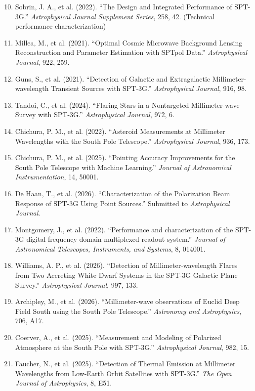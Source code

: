 \documentclass[11pt,a4paper]{article}
\begin{document}
\begin{enumerate}
\setcounter{enumi}{9}
\item Sobrin, J. A., et al. (2022). ``The Design and Integrated Performance of SPT-3G.'' \textit{Astrophysical Journal Supplement Series}, 258, 42. (Technical performance characterization)

\item Millea, M., et al. (2021). ``Optimal Cosmic Microwave Background Lensing Reconstruction and Parameter Estimation with SPTpol Data.'' \textit{Astrophysical Journal}, 922, 259.

\item Guns, S., et al. (2021). ``Detection of Galactic and Extragalactic Millimeter-wavelength Transient Sources with SPT-3G.'' \textit{Astrophysical Journal}, 916, 98.

\item Tandoi, C., et al. (2024). ``Flaring Stars in a Nontargeted Millimeter-wave Survey with SPT-3G.'' \textit{Astrophysical Journal}, 972, 6.

\item Chichura, P. M., et al. (2022). ``Asteroid Measurements at Millimeter Wavelengths with the South Pole Telescope.'' \textit{Astrophysical Journal}, 936, 173.

\item Chichura, P. M., et al. (2025). ``Pointing Accuracy Improvements for the South Pole Telescope with Machine Learning.'' \textit{Journal of Astronomical Instrumentation}, 14, 50001.

\item De Haan, T., et al. (2026). ``Characterization of the Polarization Beam Response of SPT-3G Using Point Sources.'' Submitted to \textit{Astrophysical Journal}.

\item Montgomery, J., et al. (2022). ``Performance and characterization of the SPT-3G digital frequency-domain multiplexed readout system.'' \textit{Journal of Astronomical Telescopes, Instruments, and Systems}, 8, 014001.

\item Williams, A. P., et al. (2026). ``Detection of Millimeter-wavelength Flares from Two Accreting White Dwarf Systems in the SPT-3G Galactic Plane Survey.'' \textit{Astrophysical Journal}, 997, 133.

\item Archipley, M., et al. (2026). ``Millimeter-wave observations of Euclid Deep Field South using the South Pole Telescope.'' \textit{Astronomy and Astrophysics}, 706, A17.

\item Coerver, A., et al. (2025). ``Measurement and Modeling of Polarized Atmosphere at the South Pole with SPT-3G.'' \textit{Astrophysical Journal}, 982, 15.

\item Faucher, N., et al. (2025). ``Detection of Thermal Emission at Millimeter Wavelengths from Low-Earth Orbit Satellites with SPT-3G.'' \textit{The Open Journal of Astrophysics}, 8, E51.
\end{enumerate}
\end{document}
